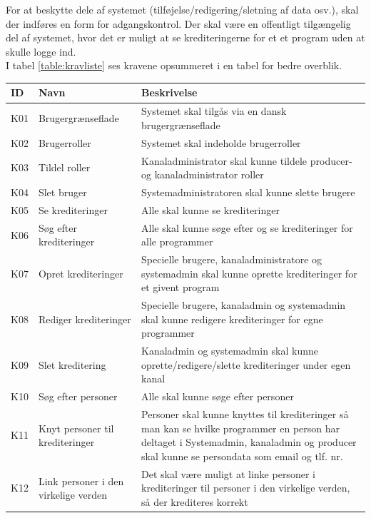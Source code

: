 \noindent
For at beskytte dele af systemet (tilføjelse/redigering/sletning af data osv.), skal der indføres en form for adgangskontrol. Der skal være en offentligt tilgængelig del af systemet, hvor det er muligt at se krediteringerne for et et program uden at skulle logge ind.\\

\noindent
I tabel \ref{table:kravliste} ses kravene opsummeret i en tabel for bedre overblik.

\begin{longtable}[h]{ |p{1cm}|p{4cm}|p{11cm}| }

\hline
\textbf{ID} & \textbf{Navn} & \textbf{Beskrivelse} \\
\hline
K01 & Brugergrænseflade & Systemet skal tilgås via en dansk brugergrænseflade \\
\hline
K02 & Brugerroller & Systemet skal indeholde brugerroller \\
\hline
\label{K03}K03 & Tildel roller & Kanaladministrator skal kunne tildele producer- og kanaladministrator roller \\
\hline
K04 & Slet bruger & Systemadministratoren skal kunne slette brugere \\
\hline
K05 & Se krediteringer & Alle skal kunne se krediteringer \\
\hline
K06 & Søg efter krediteringer & Alle skal kunne søge efter og se krediteringer for alle programmer \\
\hline
K07 & Opret krediteringer & Specielle brugere, kanaladministratore og systemadmin skal kunne oprette
krediteringer for et givent program \\
\hline
K08 & Rediger krediteringer & Specielle brugere, kanaladmin og systemadmin skal kunne redigere krediteringer for egne programmer \\
\hline
K09 & Slet kreditering & Kanaladmin og systemadmin skal kunne oprette/redigere/slette krediteringer under egen kanal \\
\hline
K10 & Søg efter personer & Alle skal kunne søge efter personer \\
\hline
K11 & Knyt personer til krediteringer & Personer skal kunne knyttes til krediteringer så man kan se hvilke programmer en person har deltaget i Systemadmin, kanaladmin og producer skal kunne se persondata som email og tlf. nr. \\
\hline
K12 & Link personer i den virkelige verden & Det skal være muligt at linke personer i krediteringer til personer i den virkelige verden, så der krediteres korrekt \\

\end{longtable}
